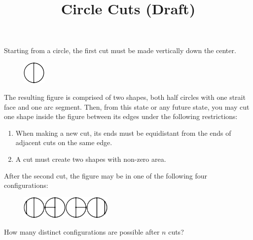 \documentclass[12pt]{article}
\title{Circle Cuts (Draft)}
\begin{document}
\maketitle

Starting from a circle, the first cut must be made vertically down the center.

\begin{figure}[h]
    \centering
    \includegraphics[width=0.10\textwidth]{cut1.png}
    \label{fig:first_cut}
\end{figure}

The resulting figure is comprised of two shapes, both half circles with one strait face
and one arc segment. Then, from this state or any future state, you may cut one shape inside
the figure between its edges under the following restrictions:

\begin{enumerate}
    \item When making a new cut, its ends must be equidistant from the ends of adjacent cuts on the same edge.
    \item A cut must create two shapes with non-zero area.
\end{enumerate}

After the second cut, the figure may be in one of the following four configurations:

\begin{figure}[h]
    \centering
    \includegraphics[width=0.40\textwidth]{cut2.png}
    \label{fig:first_cut}
\end{figure}

How many distinct configurations are possible after $n$ cuts?
\end{document}
